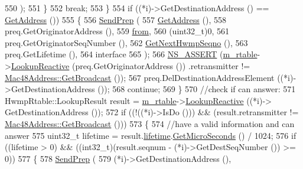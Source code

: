 \begin{DoxyCode}
550                 );
551             \}
552           \textcolor{keywordflow}{break};
553         \}
554       \textcolor{keywordflow}{if} ((*i)->GetDestinationAddress () == \hyperlink{classns3_1_1dot11s_1_1HwmpProtocol_ab8b2c6d98ae278406f543e25feca8ccc}{GetAddress} ())
555         \{
556           \hyperlink{classns3_1_1dot11s_1_1HwmpProtocol_a61cb0a88964f864c0cc8480160c4689b}{SendPrep} (
557             \hyperlink{classns3_1_1dot11s_1_1HwmpProtocol_ab8b2c6d98ae278406f543e25feca8ccc}{GetAddress} (),
558             preq.GetOriginatorAddress (),
559             \hyperlink{lte__amc_8m_a1b4c81ff74eb1a626b5ade44c81004b3}{from},
560             (uint32\_t)0,
561             preq.GetOriginatorSeqNumber (),
562             \hyperlink{classns3_1_1dot11s_1_1HwmpProtocol_a1b627657878666de9b9c913d82c35853}{GetNextHwmpSeqno} (),
563             preq.GetLifetime (),
564             interface
565             );
566           \hyperlink{assert_8h_a6dccdb0de9b252f60088ce281c49d052}{NS\_ASSERT} (\hyperlink{classns3_1_1dot11s_1_1HwmpProtocol_a12fda0e3e5a400888c8ba1a87c1a7216}{m\_rtable}->\hyperlink{classns3_1_1dot11s_1_1HwmpRtable_a41a44ed94c1ed4d798f3278ba8db0f1f}{LookupReactive} (preq.GetOriginatorAddress ())
      .retransmitter != \hyperlink{classns3_1_1Mac48Address_a55156e302c6bf950c0b558365adbde84}{Mac48Address::GetBroadcast} ());
567           preq.DelDestinationAddressElement ((*i)->GetDestinationAddress ());
568           \textcolor{keywordflow}{continue};
569         \}
570       \textcolor{comment}{//check if can answer:}
571       HwmpRtable::LookupResult result = \hyperlink{classns3_1_1dot11s_1_1HwmpProtocol_a12fda0e3e5a400888c8ba1a87c1a7216}{m\_rtable}->\hyperlink{classns3_1_1dot11s_1_1HwmpRtable_a41a44ed94c1ed4d798f3278ba8db0f1f}{LookupReactive} ((*i)->
      GetDestinationAddress ());
572       \textcolor{keywordflow}{if} ((!((*i)->IsDo ())) && (result.retransmitter != 
      \hyperlink{classns3_1_1Mac48Address_a55156e302c6bf950c0b558365adbde84}{Mac48Address::GetBroadcast} ()))
573         \{
574           \textcolor{comment}{//have a valid information and can answer}
575           uint32\_t lifetime = result.\hyperlink{structns3_1_1dot11s_1_1HwmpRtable_1_1LookupResult_aad778ea58c7f2147815c0349cc677f29}{lifetime}.\hyperlink{classns3_1_1Time_a2542b9273c336da11fcaf54e8bc6e4c8}{GetMicroSeconds} () / 1024;
576           \textcolor{keywordflow}{if} ((lifetime > 0) && ((int32\_t)(result.seqnum - (*i)->GetDestSeqNumber ()) >= 0))
577             \{
578               \hyperlink{classns3_1_1dot11s_1_1HwmpProtocol_a61cb0a88964f864c0cc8480160c4689b}{SendPrep} (
579                 (*i)->GetDestinationAddress (),

\end{DoxyCode}
